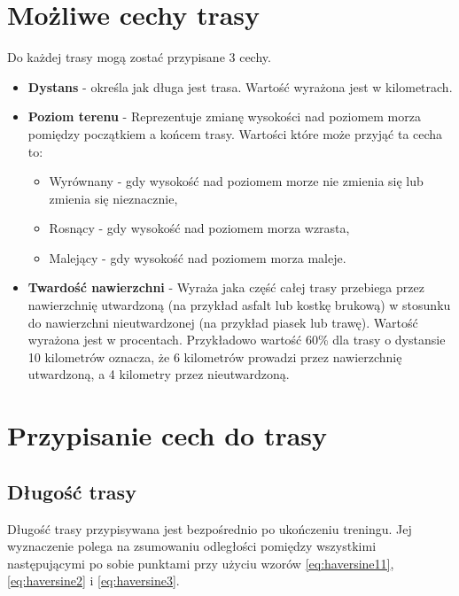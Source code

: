 \section{Możliwe cechy trasy}\label{chap:opis-cech}
Do każdej trasy mogą zostać przypisane 3 cechy.
\begin{itemize}
\item{\textbf{Dystans}} - określa jak długa jest trasa. Wartość wyrażona jest w kilometrach.
\item{\textbf{Poziom terenu}} - Reprezentuje zmianę wysokości nad poziomem morza pomiędzy początkiem a końcem trasy. Wartości które może przyjąć ta cecha to:
\begin{itemize}
\item{Wyrównany} - gdy wysokość nad poziomem morze nie zmienia się lub zmienia się nieznacznie,
\item{Rosnący} - gdy wysokość nad poziomem morza wzrasta,
\item{Malejący} - gdy wysokość nad poziomem morza maleje.
\end{itemize}
\item{\textbf{Twardość nawierzchni}} - Wyraża jaka część całej trasy przebiega przez nawierzchnię utwardzoną (na przykład asfalt lub kostkę brukową) w stosunku do nawierzchni nieutwardzonej (na przykład piasek lub trawę). Wartość wyrażona jest w procentach. Przykładowo wartość 60\% dla trasy o dystansie 10 kilometrów oznacza, że 6 kilometrów prowadzi przez nawierzchnię utwardzoną, a 4 kilometry przez nieutwardzoną.
\end{itemize}
\section{Przypisanie cech do trasy}\label{chap:przypisanie-cech}
\subsection{Długość trasy}
Długość trasy przypisywana jest bezpośrednio po ukończeniu treningu. Jej wyznaczenie polega na zsumowaniu odległości pomiędzy wszystkimi następującymi po sobie punktami przy użyciu wzorów \ref{eq:haversine11},  \ref{eq:haversine2} i \ref{eq:haversine3}.

